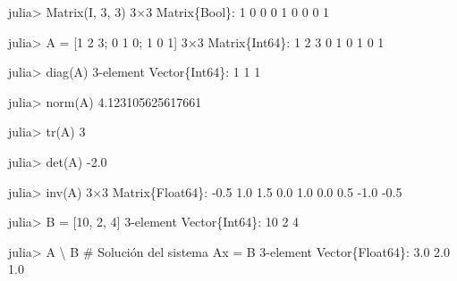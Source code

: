 \documentclass[
  letterpaper,
  DIV=11,
  numbers=noendperiod]{scrreprt}
\newenvironment{Shaded}{\begin{snugshade}}{\end{snugshade}}
\newcommand{\CommentTok}[1]{\textcolor[rgb]{0.37,0.37,0.37}{#1}}
\newcommand{\DataTypeTok}[1]{\textcolor[rgb]{0.68,0.00,0.00}{#1}}
\newcommand{\FloatTok}[1]{\textcolor[rgb]{0.68,0.00,0.00}{#1}}
\newcommand{\FunctionTok}[1]{\textcolor[rgb]{0.28,0.35,0.67}{#1}}
\newcommand{\NormalTok}[1]{\textcolor[rgb]{0.00,0.23,0.31}{#1}}
\newcommand{\OperatorTok}[1]{\textcolor[rgb]{0.37,0.37,0.37}{#1}}
\begin{document}
\begin{Shaded}
\begin{Highlighting}[]
\NormalTok{julia}\OperatorTok{\textgreater{}} \FunctionTok{Matrix}\NormalTok{(I, }\FloatTok{3}\NormalTok{, }\FloatTok{3}\NormalTok{)}
\FloatTok{3}\OperatorTok{×}\FloatTok{3} \DataTypeTok{Matrix}\NormalTok{\{}\DataTypeTok{Bool}\NormalTok{\}}\OperatorTok{:}
 \FloatTok{1}  \FloatTok{0}  \FloatTok{0}
 \FloatTok{0}  \FloatTok{1}  \FloatTok{0}
 \FloatTok{0}  \FloatTok{0}  \FloatTok{1}

\NormalTok{julia}\OperatorTok{\textgreater{}}\NormalTok{ A }\OperatorTok{=}\NormalTok{ [}\FloatTok{1} \FloatTok{2} \FloatTok{3}\NormalTok{; }\FloatTok{0} \FloatTok{1} \FloatTok{0}\NormalTok{; }\FloatTok{1} \FloatTok{0} \FloatTok{1}\NormalTok{]}
\FloatTok{3}\OperatorTok{×}\FloatTok{3} \DataTypeTok{Matrix}\NormalTok{\{}\DataTypeTok{Int64}\NormalTok{\}}\OperatorTok{:}
 \FloatTok{1}  \FloatTok{2}  \FloatTok{3}
 \FloatTok{0}  \FloatTok{1}  \FloatTok{0}
 \FloatTok{1}  \FloatTok{0}  \FloatTok{1}

\NormalTok{julia}\OperatorTok{\textgreater{}} \FunctionTok{diag}\NormalTok{(A)}
\FloatTok{3}\OperatorTok{{-}}\NormalTok{element }\DataTypeTok{Vector}\NormalTok{\{}\DataTypeTok{Int64}\NormalTok{\}}\OperatorTok{:}
 \FloatTok{1}
 \FloatTok{1}
 \FloatTok{1}

\NormalTok{julia}\OperatorTok{\textgreater{}} \FunctionTok{norm}\NormalTok{(A)}
\FloatTok{4.123105625617661}

\NormalTok{julia}\OperatorTok{\textgreater{}} \FunctionTok{tr}\NormalTok{(A)}
\FloatTok{3}

\NormalTok{julia}\OperatorTok{\textgreater{}} \FunctionTok{det}\NormalTok{(A)}
\OperatorTok{{-}}\FloatTok{2.0}

\NormalTok{julia}\OperatorTok{\textgreater{}} \FunctionTok{inv}\NormalTok{(A)}
\FloatTok{3}\OperatorTok{×}\FloatTok{3} \DataTypeTok{Matrix}\NormalTok{\{}\DataTypeTok{Float64}\NormalTok{\}}\OperatorTok{:}
 \OperatorTok{{-}}\FloatTok{0.5}   \FloatTok{1.0}   \FloatTok{1.5}
  \FloatTok{0.0}   \FloatTok{1.0}   \FloatTok{0.0}
  \FloatTok{0.5}  \OperatorTok{{-}}\FloatTok{1.0}  \OperatorTok{{-}}\FloatTok{0.5}

\NormalTok{julia}\OperatorTok{\textgreater{}}\NormalTok{ B }\OperatorTok{=}\NormalTok{ [}\FloatTok{10}\NormalTok{, }\FloatTok{2}\NormalTok{, }\FloatTok{4}\NormalTok{]}
\FloatTok{3}\OperatorTok{{-}}\NormalTok{element }\DataTypeTok{Vector}\NormalTok{\{}\DataTypeTok{Int64}\NormalTok{\}}\OperatorTok{:}
 \FloatTok{10}
  \FloatTok{2}
  \FloatTok{4}

\NormalTok{julia}\OperatorTok{\textgreater{}}\NormalTok{ A }\OperatorTok{\textbackslash{}}\NormalTok{ B  }\CommentTok{\# Solución del sistema Ax = B}
\FloatTok{3}\OperatorTok{{-}}\NormalTok{element }\DataTypeTok{Vector}\NormalTok{\{}\DataTypeTok{Float64}\NormalTok{\}}\OperatorTok{:}
 \FloatTok{3.0}
 \FloatTok{2.0}
 \FloatTok{1.0}
\end{Highlighting}
\end{Shaded}
\end{document}
